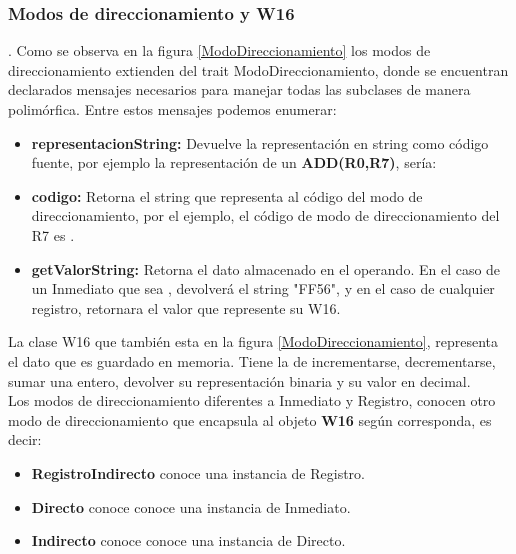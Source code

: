 
\subsubsection{Modos de direccionamiento y W16}

. 
Como se observa en la figura \ref{ModoDireccionamiento} los modos de direccionamiento extienden del trait ModoDireccionamiento, donde se encuentran declarados mensajes necesarios para manejar todas las subclases de manera polimórfica. Entre estos mensajes podemos enumerar:
\begin{itemize}
\item  \textbf{representacionString:}
Devuelve la representación en string como código fuente, por ejemplo la representación de un  \textbf{ADD(R0,R7)}, sería: 
\item  \textbf{codigo:}
Retorna el string que representa al código del modo de direccionamiento, por el ejemplo, el código de modo de direccionamiento del R7 es . 
\item  \textbf{getValorString:}
Retorna el dato almacenado en el operando. En el caso de un Inmediato que sea , devolverá el string "FF56", y en el caso de cualquier registro, retornara el valor que represente su W16.
\end{itemize}


La clase W16 que también esta en la figura \ref{ModoDireccionamiento}, representa el dato que es guardado en memoria. Tiene la  de incrementarse, decrementarse, sumar una entero, devolver su representación binaria y su valor en decimal.\\

Los modos de direccionamiento diferentes a Inmediato y Registro, conocen otro modo de direccionamiento que encapsula al objeto \textbf{W16} según corresponda, es decir:
\begin{itemize}
\item \textbf{RegistroIndirecto} conoce una instancia de Registro.
\item \textbf{Directo} conoce conoce una instancia de Inmediato.
\item \textbf{Indirecto} conoce conoce una instancia de Directo.
\end{itemize}

